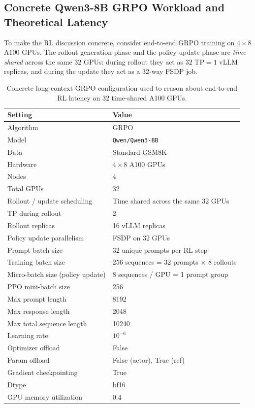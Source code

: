 \documentclass[11pt]{article}
\begin{document}
\subsection{Concrete Qwen3-8B GRPO Workload and Theoretical Latency}

To make the RL discussion concrete, consider end-to-end GRPO training on $4 \times 8$
A100 GPUs. The rollout generation phase and the policy-update phase are
\emph{time shared} across the same $32$ GPUs: during rollout they act as $32$
TP$=1$ vLLM replicas, and during the update they act as a $32$-way FSDP job.

\begin{table}[ht]
    \centering
    \small
    \begin{tabular}{ll}
        \toprule
        Setting & Value \\
        \midrule
        Algorithm & GRPO \\
        Model & \texttt{Qwen/Qwen3-8B} \\
        Data & Standard GSM8K \\
        Hardware & $4 \times 8$ A100 GPUs \\
        Nodes & 4 \\
        Total GPUs & 32 \\
        Rollout / update scheduling & Time shared across the same 32 GPUs \\
        TP during rollout & 2 \\
        Rollout replicas & 16 vLLM replicas \\
        Policy update parallelism & FSDP on 32 GPUs \\
        Prompt batch size & 32 unique prompts per RL step \\
        Training batch size & 256 sequences = 32 prompts $\times$ 8 rollouts \\
        Micro-batch size (policy update) & 8 sequences / GPU = 1 prompt group \\
        PPO mini-batch size & 256 \\
        Max prompt length & 8192 \\
        Max response length & 2048 \\
        Max total sequence length & 10240 \\
        Learning rate & $10^{-6}$ \\
        Optimizer offload & False \\
        Param offload & False (actor), True (ref) \\
        Gradient checkpointing & True \\
        Dtype & bf16 \\
        GPU memory utilization & 0.4 \\
        \bottomrule
    \end{tabular}
    \caption{Concrete long-context GRPO configuration used to reason about end-to-end RL latency on $32$ time-shared A100 GPUs.}
\end{table}
\end{document}
